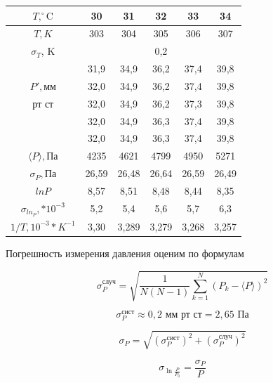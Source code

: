 \documentclass[a4paper,12pt]{article} %
\begin{document}
\begin{tabular}{|c|c|c|c|c|c|}
\hline 
$T, ^\circ \text{C}$ & 30 & 31 & 32 & 33 & 34 \\ 
\hline 
$T, K$ & 303 & 304 & 305 & 306 & 307 \\ 
\hline 
$\sigma_T$, K & \multicolumn{5}{c|}{0,2} \\ 
\hline 
 & 31,9 & 34,9 & 36,2 & 37,4 & 39,8 \\ 
\hhline{~-----} 
$P', \text{мм}$ & 32,0 & 34,9 & 36,2 & 37,4 & 39,8	 \\ 
\hhline{~-----}  
$\text{рт ст}$ & 32,0 & 34,9 & 36,2 & 37,3 & 39,8 \\ 
\hhline{~-----} 
 & 32,0 & 34,9 & 36,3 & 37,4 & 39,8 \\ 
\hhline{~-----} 
 & 32,0 & 34,9 & 36,3 & 37,4 & 39,8 \\ 
\hline 
$\langle P \rangle, \text{Па} $ & 4235 & 4621 & 4799 & 4950 & 5271 \\ 
\hline 
$\sigma_P, \text{Па}$ & 26,59 & 26,48 & 26,64 & 26,59 & 26,49 \\ 
\hline 
$ln{P}$ & 8,57 & 8,51 & 8,48 & 8,44 & 8,35 \\ 
\hline 
$\sigma_{ln_P}, *10^{-3}$ & 5,2 & 5,4 & 5,6 & 5,7 & 6,3 \\ 
\hline 
$1/T, 10^{-3}*K^{-1}$ & 3,30 & 3,289 & 3,279 & 3,268 & 3,257 \\ 
\hline 
\end{tabular}

\medskip
\medskip
\medskip
\medskip

\noindent Погрешность измерения давления оценим по формулам 

\medskip

\begin{equation}
\sigma_{P}^{\text{случ}} = \sqrt{\frac{1}{N(N-1)}\sum\limits_{k=1}^N\left(P_k-\langle P \rangle\right)^2}
\end{equation}

\medskip

\begin{equation}
\sigma_{P}^\text{сист} \approx 0,2 \text{ мм рт ст} = 2,65 \text{ Па}
\end{equation}

\medskip

\begin{equation}
\sigma_{P}=\sqrt{(\sigma_{P}^\text{сист})^2 + (\sigma_{P}^\text{случ})^2}
\end{equation}

\medskip

$$\sigma_{\ln{\frac{P}{P_0}}} = \frac{\sigma_P}{P} $$
\end{document}
